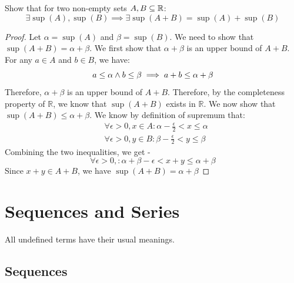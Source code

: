 \documentclass[openany]{book}
\begin{document}
\begin{exercise}
    Show that for two non-empty sets $A, B \subseteq \mathbb{R}$: 
    $$\exists \sup(A), \sup(B) \implies \exists \sup (A + B) = \sup(A) + \sup(B)$$
\end{exercise}
\begin{proof}
Let $\alpha = \sup(A)$ and $\beta = \sup(B)$. We need to show that $\sup(A + B) = \alpha + \beta$.
We first show that $\alpha + \beta$ is an upper bound of $A + B$. For any $a \in A$ and $b \in B$, we have:
$$a \leq \alpha \wedge b \leq \beta \implies a + b \leq \alpha + \beta$$
Therefore, $\alpha + \beta$ is an upper bound of $A + B$. Therefore, by the completeness property of $\mathbb{R}$, we know that $\sup(A + B)$ exists in $\mathbb{R}$. We now show that $\sup(A + B) \leq \alpha + \beta$. We know by definition of supremum that: 
\begin{align*}
    &\forall \epsilon > 0, x \in A: \alpha - \frac{\epsilon}{2} < x \leq \alpha \\
    &\forall \epsilon > 0, y \in B: \beta - \frac{\epsilon}{2} < y \leq \beta 
\end{align*}
Combining the two inequalities, we get - 
$$ \forall \epsilon > 0,: \alpha + \beta - \epsilon < x + y \leq \alpha + \beta$$
Since $x+y \in A+B$, we have $\sup(A+B) = \alpha + \beta$
\end{proof}




\chapter{Sequences and Series}
All undefined terms have their usual meanings. 
\section{Sequences}
\end{document}
